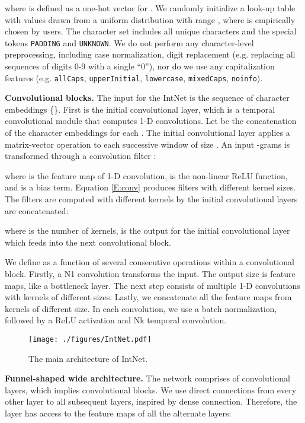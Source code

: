\documentclass[11pt,a4paper]{article}
\begin{document}
where  is defined as a one-hot vector for . We randomly initialize a look-up table with values drawn from a uniform distribution with range , where  is empirically chosen by users. The character set includes all unique characters and the special tokens {\tt PADDING} and {\tt UNKNOWN}. We do not perform any character-level preprocessing, including case normalization, digit replacement (e.g. replacing all sequences of digits 0-9 with a single ``0''), nor do we use any capitalization features (e.g. {\tt allCaps}, {\tt upperInitial}, {\tt lowercase}, {\tt mixedCaps}, {\tt noinfo}).

\textbf{Convolutional blocks.} The input for the IntNet is the sequence of character embeddings \{\}. First is the initial convolutional layer, which is a temporal convolutional module that computes 1-D convolutions. Let  be the concatenation of the character embeddings for each . The initial convolutional layer applies a matrix-vector operation to each successive window of size . An input -grams  is transformed through a convolution filter :


where  is the feature map of 1-D convolution,   is the non-linear ReLU function, and  is a bias term. Equation \ref{E:conv} produces  filters with different kernel sizes. The filters are computed with different kernels by the initial convolutional layers are concatenated: 


where  is the number of kernels,  is the output for the initial convolutional layer which feeds into the next convolutional block. 

We define  as a function of several consecutive operations within a convolutional block. Firstly, a N1 convolution transforms the input. The output size is  feature maps, like a bottleneck layer. The next step consists of multiple 1-D convolutions with kernels of different sizes. Lastly, we concatenate all the feature maps from kernels of different size. In each convolution, we use a batch normalization, followed by a ReLU activation and Nk temporal convolution.

\begin{figure}[!htb]
  \centering
  \texttt{[image: ./figures/IntNet.pdf]}
  \caption{The main architecture of IntNet.}
  \label{fig-DCC2W}
\end{figure}

\textbf{Funnel-shaped wide architecture.} The network comprises of  convolutional layers, which implies  convolutional blocks. We use direct connections from every other layer to all subsequent layers, inspired by dense connection. Therefore, the  layer has access to the feature maps of all the alternate layers:
\end{document}
